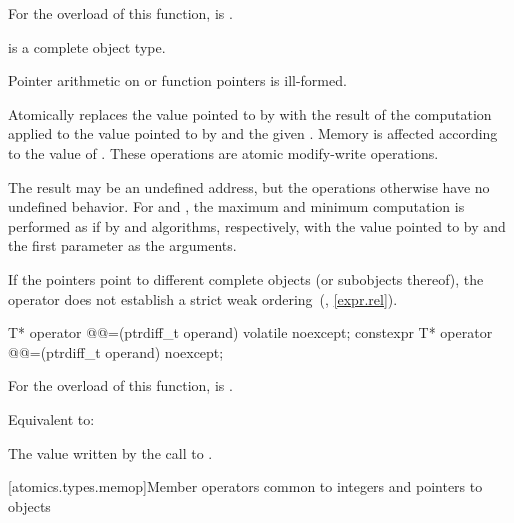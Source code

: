 \begin{itemdescr}
\pnum
\constraints
For the  overload of this function,
 is .

\pnum
\mandates
{} is a complete object type.
\begin{note}
Pointer arithmetic on  or function pointers is ill-formed.
\end{note}

\pnum
\effects
Atomically replaces the value pointed to by 
with the result of the computation applied to
the value pointed to by  and the given .
Memory is affected according to the value of .
These operations are atomic modify-write operations.

\pnum
\remarks
The result may be an undefined address,
but the operations otherwise have no undefined behavior.
For  and ,
the maximum and minimum computation is performed
as if by  and  algorithms, respectively,
with the value pointed to by  and
the first parameter as the arguments.
\begin{note}
If the pointers point to different complete objects (or subobjects thereof),
the \tcode{<} operator does not establish
a strict weak ordering~(, \ref{expr.rel}).
\end{note}
\end{itemdescr}

%
%
\begin{itemdecl}
T* operator @@=(ptrdiff_t operand) volatile noexcept;
constexpr T* operator @@=(ptrdiff_t operand) noexcept;
\end{itemdecl}

\begin{itemdescr}
\pnum
\constraints
For the  overload of this function,
 is .

\pnum
\effects
Equivalent to: 

\pnum
\returns
The value written by the call to .
\end{itemdescr}

[atomics.types.memop]{Member operators common to integers and pointers to objects}

